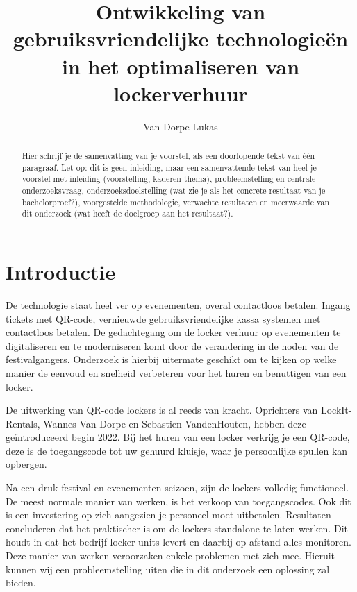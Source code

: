 \documentclass{hogent-article}
\title{Ontwikkeling van gebruiksvriendelijke technologieën in het optimaliseren van lockerverhuur}
\author{Van Dorpe Lukas}
\begin{document}
\begin{abstract}
  Hier schrijf je de samenvatting van je voorstel, als een doorlopende tekst van één paragraaf. Let op: dit is geen inleiding, maar een samenvattende tekst van heel je voorstel met inleiding (voorstelling, kaderen thema), probleemstelling en centrale onderzoeksvraag, onderzoeksdoelstelling (wat zie je als het concrete resultaat van je bachelorproef?), voorgestelde methodologie, verwachte resultaten en meerwaarde van dit onderzoek (wat heeft de doelgroep aan het resultaat?).
\end{abstract}

\tableofcontents

% 


\section{Introductie}%
\label{sec:introductie}

De technologie staat heel ver op evenementen, overal contactloos betalen. Ingang tickets met QR-code, vernieuwde gebruiksvriendelijke kassa systemen met contactloos betalen. De gedachtegang om de locker verhuur op evenementen te digitaliseren en te moderniseren komt door de verandering in de noden van de festivalgangers. Onderzoek is hierbij uitermate geschikt om te kijken op welke manier de eenvoud en snelheid verbeteren voor het huren en benuttigen van een locker. 

De uitwerking van QR-code lockers is al reeds van kracht. Oprichters van LockIt-Rentals, Wannes Van Dorpe en Sebastien VandenHouten, hebben deze geïntroduceerd begin 2022. Bij het huren van een locker verkrijg je een QR-code, deze is de toegangscode tot uw gehuurd kluisje, waar je persoonlijke spullen kan opbergen.

Na een druk festival en evenementen seizoen, zijn de lockers volledig functioneel. De meest normale manier van werken, is het verkoop van toegangscodes. Ook dit is een investering op zich aangezien je personeel moet uitbetalen. Resultaten concluderen dat het praktischer is om de lockers standalone te laten werken. Dit houdt in dat het bedrijf locker units levert en daarbij op afstand alles monitoren. Deze manier van werken veroorzaken enkele problemen met zich mee. Hieruit kunnen wij een probleemstelling uiten die in dit onderzoek een oplossing zal bieden. 
\end{document}

